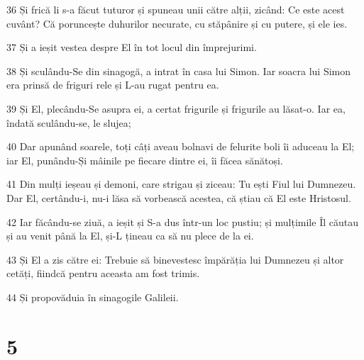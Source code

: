 \par 36 Și frică li s-a făcut tuturor și spuneau unii către alții, zicând: Ce este acest cuvânt? Că poruncește duhurilor necurate, cu stăpânire și cu putere, și ele ies.
\par 37 Și a ieșit vestea despre El în tot locul din împrejurimi.
\par 38 Și sculându-Se din sinagogă, a intrat în casa lui Simon. Iar soacra lui Simon era prinsă de friguri rele și L-au rugat pentru ea.
\par 39 Și El, plecându-Se asupra ei, a certat frigurile și frigurile au lăsat-o. Iar ea, îndată sculându-se, le slujea;
\par 40 Dar apunând soarele, toți câți aveau bolnavi de felurite boli îi aduceau la El; iar El, punându-Și mâinile pe fiecare dintre ei, îi făcea sănătoși.
\par 41 Din mulți ieșeau și demoni, care strigau și ziceau: Tu ești Fiul lui Dumnezeu. Dar El, certându-i, nu-i lăsa să vorbească acestea, că știau că El este Hristosul.
\par 42 Iar făcându-se ziuă, a ieșit și S-a dus într-un loc pustiu; și mulțimile Îl căutau și au venit până la El, și-L țineau ca să nu plece de la ei.
\par 43 Și El a zis către ei: Trebuie să binevestesc împărăția lui Dumnezeu și altor cetăți, fiindcă pentru aceasta am fost trimis.
\par 44 Și propovăduia în sinagogile Galileii.

\chapter{5}

